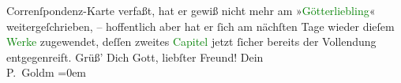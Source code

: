                Correnſpondenz-Karte verfaßt, hat er gewiß nicht mehr am »\textcolor{green}{Götterliebling}{}« weitergeſchrieben, –
               hoffentlich aber hat  er ſich am nächſten Tage
               wieder dieſem \textcolor{green}{Werke}{}
               zugewendet, deſſen  zweites \textcolor{green}{Capitel}{} jetzt
                  \strikeout{\textcolor{gray}{faſ}} ſicher bereits der {\pb}Vollendung
               entgegenreift.\pend
           \pstart
           Grüß’ Dich Gott, liebſter Freund!\pend
           \pstart
           Dein {\\[\baselineskip]}\spacefill\mbox{P. Goldm}\pend
           \leftskip=0em{}\endnumbering{}\begin{anhang}\end{anhang}
      
